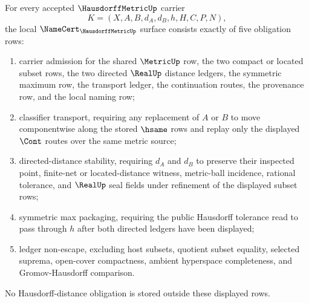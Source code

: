 \begin{theorem}
\label{thm:hausdorff-metric-namecert-obligations}
For every accepted $\HausdorffMetricUp$ carrier
$$
K=(X,A,B,d_A,d_B,h,H,C,P,N),
$$
the local $\NameCert_{\HausdorffMetricUp}$ surface consists exactly of five obligation rows:
\begin{enumerate}
\item carrier admission for the shared $\MetricUp$ row, the two compact or located subset rows, the two directed $\RealUp$ distance ledgers, the symmetric maximum row, the transport ledger, the continuation routes, the provenance row, and the local naming row;
\item classifier transport, requiring any replacement of $A$ or $B$ to move componentwise along the stored $\hsame$ rows and replay only the displayed $\Cont$ routes over the same metric source;
\item directed-distance stability, requiring $d_A$ and $d_B$ to preserve their inspected point, finite-net or located-distance witness, metric-ball incidence, rational tolerance, and $\RealUp$ seal fields under refinement of the displayed subset rows;
\item symmetric max packaging, requiring the public Hausdorff tolerance read to pass through $h$ after both directed ledgers have been displayed;
\item ledger non-escape, excluding host subsets, quotient subset equality, selected suprema, open-cover compactness, ambient hyperspace completeness, and Gromov-Hausdorff comparison.
\end{enumerate}
No Hausdorff-distance obligation is stored outside these displayed rows.
\end{theorem}
